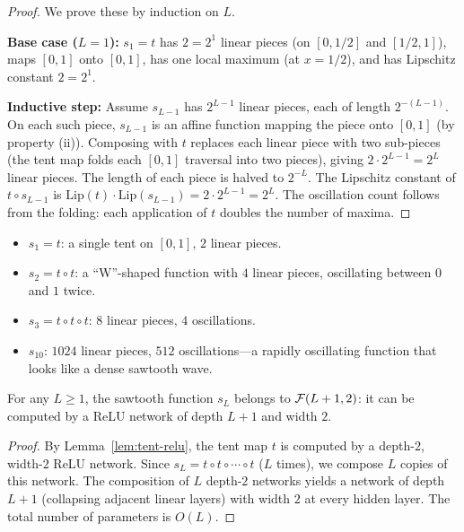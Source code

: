 \documentclass[11pt,a4paper]{article}
\begin{document}
\begin{proof}
We prove these by induction on $L$.

\textbf{Base case ($L = 1$):} $s_1 = t$ has $2 = 2^1$ linear pieces
(on $[0,1/2]$ and $[1/2,1]$), maps $[0,1]$ onto $[0,1]$, has one
local maximum (at $x = 1/2$), and has Lipschitz constant $2 = 2^1$.

\textbf{Inductive step:}  Assume $s_{L-1}$ has $2^{L-1}$ linear pieces,
each of length $2^{-(L-1)}$.  On each such piece, $s_{L-1}$ is an
affine function mapping the piece onto $[0,1]$ (by property (ii)).
Composing with $t$ replaces each linear piece with two sub-pieces
(the tent map folds each $[0,1]$ traversal into two pieces), giving
$2 \cdot 2^{L-1} = 2^L$ linear pieces.  The length of each piece is
halved to $2^{-L}$.  The Lipschitz constant of $t \circ s_{L-1}$ is
$\text{Lip}(t) \cdot \text{Lip}(s_{L-1}) = 2 \cdot 2^{L-1} = 2^L$.
The oscillation count follows from the folding: each application of
$t$ doubles the number of maxima.
\end{proof}

\begin{example}
\label{ex:sawtooth-small}
\begin{itemize}[nosep]
  \item $s_1 = t$: a single tent on $[0,1]$, $2$ linear pieces.
  \item $s_2 = t \circ t$: a ``W''-shaped function with $4$ linear pieces,
    oscillating between $0$ and $1$ twice.
  \item $s_3 = t \circ t \circ t$: $8$ linear pieces, $4$ oscillations.
  \item $s_{10}$: $1024$ linear pieces, $512$ oscillations---a rapidly
    oscillating function that looks like a dense sawtooth wave.
\end{itemize}
\end{example}

\begin{proposition}
\label{prop:sawtooth-deep}
For any $L \ge 1$, the sawtooth function $s_L$ belongs to
$\mathcal{F}(L+1, 2)$: it can be computed by a ReLU network of depth
$L + 1$ and width $2$.
\end{proposition}

\begin{proof}
By Lemma~\ref{lem:tent-relu}, the tent map $t$ is computed by a
depth-$2$, width-$2$ ReLU network.  Since $s_L = t \circ t \circ
\cdots \circ t$ ($L$ times), we compose $L$ copies of this network.
The composition of $L$ depth-$2$ networks yields a network of depth
$L + 1$ (collapsing adjacent linear layers) with width $2$ at every
hidden layer.  The total number of parameters is $O(L)$.
\end{proof}
\end{document}
